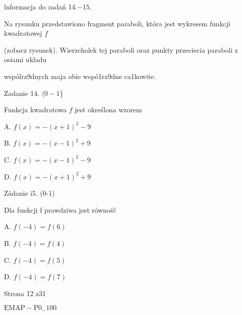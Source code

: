 \documentclass[a4paper,12pt]{article}
\begin{document}
lnformacja do zadań 14.$-15.$

Na rysunku przedstawiono fragment paraboli, która jest wykresem funkcji kwadratowej $f$

(zobacz rysunek). Wierzcholek tej paraboli oraz punkty przeciecia paraboli z osiami ukladu

wspólrz9dnych maja obie wspó1rz9dne ca1kowite.

Zadanie 14. $\langle 0-1$\}

Funkcja kwadratowa $f$ jest określona wzorem

A. $f(x)=-(x+1)^{2}-9$

B. $f(x)=-(x-1)^{2}+9$

C. $f(x)=-(x-1)^{2}-9$

D. $f(x)=-(x+1)^{2}+9$

Zädanie i5. (0-1)

Dla funkcji f prawdziwa jest równośč

A. $f(-4)=f(6)$

B. $f(-4)=f(4)$

C. $f(-4)=f(5)$

D. $f(-4)=f(7)$

Strona 12 z31

$\mathrm{E}\mathrm{M}\mathrm{A}\mathrm{P}-\mathrm{P}0_{-}100$
\end{document}
